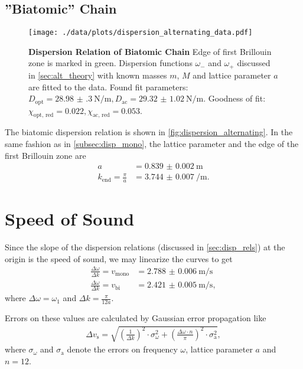 \subsection{''Biatomic'' Chain}
\begin{figure}
	\centering
	\texttt{[image: ./data/plots/dispersion\_alternating\_data.pdf]}
	\caption[Dispersion Relation of Biatomic Chain]{\textbf{Dispersion Relation of Biatomic Chain} Edge of first Brillouin zone is marked in green.
	Dispersion functions $\omega_{-}$ and $\omega_{+}$ discussed in \autoref{sec:alt_theory} with known masses $m$, $M$ and lattice parameter $a$ are fitted to the data.
	Found fit parameters: $D_\text{opt}=\SI{28.98(30)}{\newton\per\meter}, D_\text{ac}=\SI{29.32(102)}{\newton\per\meter}$. Goodness of fit: $\chi_\text{opt, red}=\num{0.022}, \chi_\text{ac, red}=\num{0.053}$.}
	\label{fig:dispersion_alternating}
\end{figure}
The biatomic dispersion relation is shown in \autoref{fig:dispersion_alternating}.
In the same fashion as in \autoref{subsec:disp_mono}, the lattice parameter and the edge of the first Brillouin zone are
\begin{align*}
	a &= \SI{0.839(2)}{\meter} \\
	k_\text{end} = \frac{\pi}{a} &= \SI{3.744(7)}{\per\meter}.
\end{align*}

\section{Speed of Sound}\label{sec:speed_of_sound}
Since the slope of the dispersion relations (discussed in \autoref{sec:disp_rels}) at the origin is the speed of sound, we may linearize the curves to get
\begin{align*}
	\frac{\Delta\omega}{\Delta k} = v_\text{mono} &= \SI{2.788(6)}{\meter\per\second} \\
	\frac{\Delta\omega}{\Delta k} = v_\text{bi} &= \SI{2.421(5)}{\meter\per\second},
\end{align*}
where $\Delta\omega = \omega_1$ and $\Delta k = \frac{\pi}{12a}$.

Errors on these values are calculated by Gaussian error propagation like
\begin{align*}
	\Delta v_\text{s} = \sqrt{\left(\frac{1}{\Delta k}\right)^2 \cdot \sigma_\omega^2 + \left(\frac{\Delta\omega\cdot n}{\pi}\right)^2 \cdot \sigma_\text{a}^2},
\end{align*}
where $\sigma_\omega$ and $\sigma_\text{a}$ denote the errors on frequency $\omega$, lattice parameter $a$ and $n=12$.

